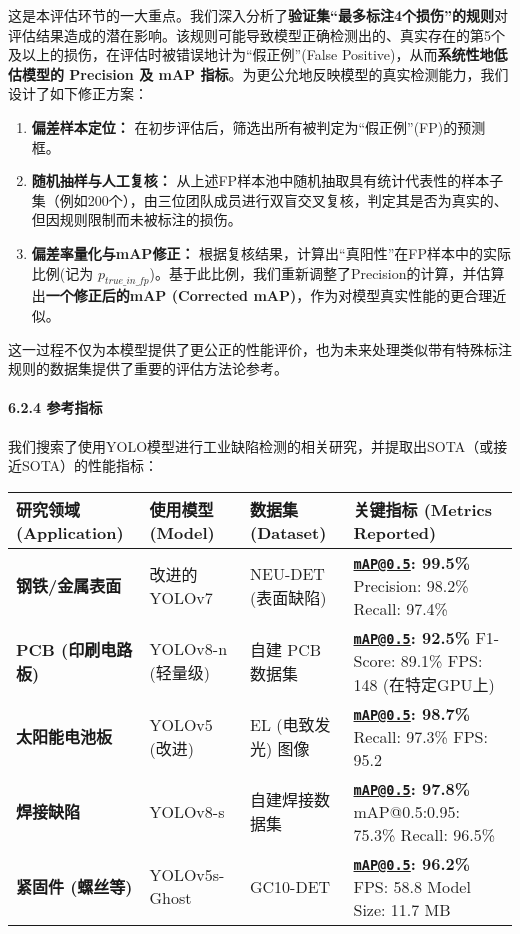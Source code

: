 \documentclass[
]{article}
\begin{document}
这是本评估环节的一大重点。我们深入分析了\textbf{验证集``最多标注4个损伤''的规则}对评估结果造成的潜在影响。该规则可能导致模型正确检测出的、真实存在的第5个及以上的损伤，在评估时被错误地计为``假正例''(False
Positive)，从而\textbf{系统性地低估模型的 Precision 及 mAP
指标}。为更公允地反映模型的真实检测能力，我们设计了如下修正方案：

\begin{enumerate}
\def\labelenumi{\arabic{enumi}.}
\item
  \textbf{偏差样本定位：}
  在初步评估后，筛选出所有被判定为``假正例''(FP)的预测框。
\item
  \textbf{随机抽样与人工复核：}
  从上述FP样本池中随机抽取具有统计代表性的样本子集（例如200个），由三位团队成员进行双盲交叉复核，判定其是否为真实的、但因规则限制而未被标注的损伤。
\item
  \textbf{偏差率量化与mAP修正：}
  根据复核结果，计算出``真阳性''在FP样本中的实际比例(记为
  \(p_{true\_in\_fp}\))。基于此比例，我们重新调整了Precision的计算，并估算出\textbf{一个修正后的mAP
  (Corrected mAP)}，作为对模型真实性能的更合理近似。
\end{enumerate}

这一过程不仅为本模型提供了更公正的性能评价，也为未来处理类似带有特殊标注规则的数据集提供了重要的评估方法论参考。

\paragraph{6.2.4 参考指标}\label{624-ux53c2ux8003ux6307ux6807}

我们搜索了使用YOLO模型进行工业缺陷检测的相关研究，并提取出SOTA（或接近SOTA）的性能指标：

\begin{longtable}[]{@{}llll@{}}
\toprule\noalign{}
\textbf{研究领域 (Application)} & \textbf{使用模型 (Model)} &
\textbf{数据集 (Dataset)} & \textbf{关键指标 (Metrics Reported)} \\
\midrule\noalign{}
\endhead
\bottomrule\noalign{}
\endlastfoot
\textbf{钢铁/金属表面} & 改进的 YOLOv7 & NEU-DET (表面缺陷) &
\textbf{\href{mailto:mAP@0.5}{\nolinkurl{mAP@0.5}}: 99.5\%} Precision:
98.2\% Recall: 97.4\% \\
\textbf{PCB (印刷电路板)} & YOLOv8-n (轻量级) & 自建 PCB 数据集 &
\textbf{\href{mailto:mAP@0.5}{\nolinkurl{mAP@0.5}}: 92.5\%} F1-Score:
89.1\% FPS: 148 (在特定GPU上) \\
\textbf{太阳能电池板} & YOLOv5 (改进) & EL (电致发光) 图像 &
\textbf{\href{mailto:mAP@0.5}{\nolinkurl{mAP@0.5}}: 98.7\%} Recall:
97.3\% FPS: 95.2 \\
\textbf{焊接缺陷} & YOLOv8-s & 自建焊接数据集 &
\textbf{\href{mailto:mAP@0.5}{\nolinkurl{mAP@0.5}}: 97.8\%}
mAP@0.5:0.95: 75.3\% Recall: 96.5\% \\
\textbf{紧固件 (螺丝等)} & YOLOv5s-Ghost & GC10-DET &
\textbf{\href{mailto:mAP@0.5}{\nolinkurl{mAP@0.5}}: 96.2\%} FPS: 58.8
Model Size: 11.7 MB \\
\end{longtable}
\end{document}
